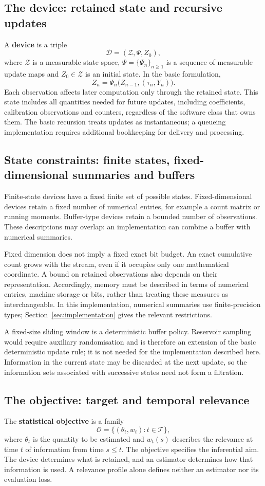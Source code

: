 \subsection{The device: retained state and recursive updates}
A \textbf{device} is a triple
\[
 \mathcal D=(\mathcal Z,\Psi,Z_0),
\]
where $\mathcal Z$ is a measurable state space, $\Psi=\{\Psi_n\}_{n\geq1}$ is a sequence of measurable update maps and $Z_0\in\mathcal Z$ is an initial state. In the basic formulation,
\[
 Z_n=\Psi_n\bigl(Z_{n-1},(\tau_n,Y_n)\bigr).
\]
Each observation affects later computation only through the retained state. This state includes all quantities needed for future updates, including coefficients, calibration observations and counters, regardless of the software class that owns them. The basic recursion treats updates as instantaneous; a queueing implementation requires additional bookkeeping for delivery and processing.

\subsection{State constraints: finite states, fixed-dimensional summaries and buffers}
Finite-state devices have a fixed finite set of possible states. Fixed-dimensional devices retain a fixed number of numerical entries, for example a count matrix or running moments. Buffer-type devices retain a bounded number of observations. These descriptions may overlap: an implementation can combine a buffer with numerical summaries.

Fixed dimension does not imply a fixed exact bit budget. An exact cumulative count grows with the stream, even if it occupies only one mathematical coordinate. A bound on retained observations also depends on their representation. Accordingly, memory must be described in terms of numerical entries, machine storage or bits, rather than treating these measures as interchangeable. In this implementation, numerical summaries use finite-precision types; Section~\ref{sec:implementation} gives the relevant restrictions.

A fixed-size sliding window is a deterministic buffer policy. Reservoir sampling would require auxiliary randomisation and is therefore an extension of the basic deterministic update rule; it is not needed for the implementation described here. Information in the current state may be discarded at the next update, so the information sets associated with successive states need not form a filtration.

\subsection{The objective: target and temporal relevance}
The \textbf{statistical objective} is a family
\[
 \mathcal O=\{(\theta_t,w_t):t\in\mathcal T\},
\]
where $\theta_t$ is the quantity to be estimated and $w_t(s)$ describes the relevance at time $t$ of information from time $s\leq t$. The objective specifies the inferential aim. The device determines what is retained, and an estimator determines how that information is used. A relevance profile alone defines neither an estimator nor its evaluation loss.

